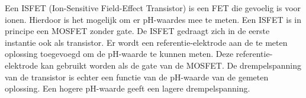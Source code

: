 Een ISFET (Ion-Sensitive Field-Effect Transistor) is een FET die gevoelig is voor ionen. Hierdoor is het mogelijk om er pH-waardes mee te meten\cite{modeling}. Een ISFET is in principe een MOSFET zonder gate. De ISFET gedraagt zich in de eerste instantie ook als transistor. Er wordt een referentie-elektrode aan de te meten oplossing toegevoegd om de pH-waarde te kunnen meten. Deze referentie-elektrode kan gebruikt worden als de gate van de MOSFET\cite{van1987isfet}. De drempelspanning van de transistor is echter een functie van de pH-waarde van de gemeten oplossing. Een hogere pH-waarde geeft een lagere drempelspanning\cite{isfet}.